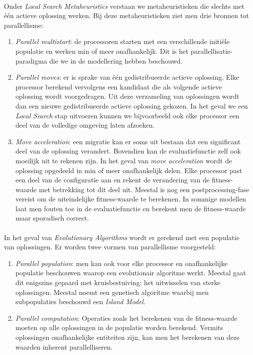 \paragraph{}
Onder \emph{Local Search Metaheuristics} verstaan we metaheuristieken die slechts met \'e\'en actieve oplossing werken. Bij deze metaheuristieken ziet men drie bronnen tot parallellisme:
\begin{enumerate}
 \item \emph{Parallel multistart}: de processoren starten met een verschillende initi\"ele populatie en werken min of meer onafhankelijk. Dit is het parallellisatie-paradigma die we in de modellering hebben beschouwd.
 \item \emph{Parallel moves}: er is sprake van \'e\'en gedistribueerde actieve oplossing. Elke processor berekend vervolgens een kandidaat die als volgende actieve oplossing wordt voorgedragen. Uit deze verzameling van oplossingen wordt dan een nieuwe gedistribueerde actieve oplossing gekozen. In het geval we een \emph{Local Search} stap uitvoeren kunnen we bijvoorbeeld ook elke processor een deel van de volledige omgeving laten afzoeken.
 \item \emph{Move acceleration}: een migratie kan er soms uit bestaan dat een significant deel van de oplossing verandert. Bovendien kan de evaluatiefunctie zelf ook moeilijk uit te rekenen zijn. In het geval van \emph{move acceleration} wordt de oplossing opgedeeld in min of meer onafhankelijk delen. Elke processor past een deel van de configuratie aan en rekent de verandering van de fitness-waarde met betrekking tot dit deel uit. Meestal is nog een postprocessing-fase vereist om de uiteindelijke fitness-waarde te berekenen. In sommige modellen laat men fouten toe in de evaluatiefunctie en berekent men de fitness-waarde maar sporadisch correct.
\end{enumerate}

\paragraph{}
In het geval van \emph{Evolutionary Algorithms} wordt er gerekend met een populatie van oplossingen. Er worden twee vormen van parallellisme voorgesteld:
\begin{enumerate}
 \item \emph{Parallel population}: men kan ook voor elke processor en onafhankelijke populatie beschouwen waarop een evolutionair algoritme werkt. Meestal gaat dit enigszins gepaard met kruisbestuiving: het uitwisselen van sterke oplossingen. Meestal noemt een genetisch algoritme waarbij men subpopulaties beschouwd een \emph{Island Model}\cite{Whitley98theisland,parallelgeneticalgorithms}.
 \item \emph{Parallel computation}: Operaties zoals het berekenen van de fitness-waarde moeten op alle oplossingen in de populatie worden berekend. Vermits oplossingen onafhankelijke entiteiten zijn, kan men het berekenen van deze waarden inherent parallelliseren.
\end{enumerate}

